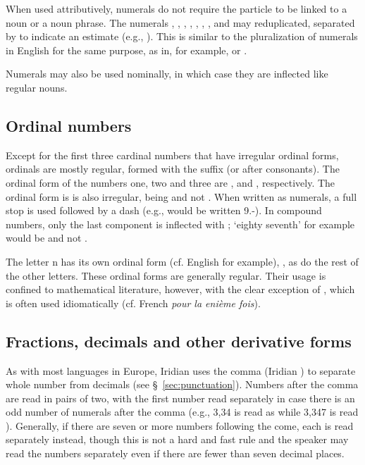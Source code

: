 When used attributively, numerals do not require the particle  to be
linked to a noun or a noun phrase. The numerals , ,
, , , , ,  and
 may reduplicated, separated by  to indicate an
estimate (e.g., ). This is similar to
the pluralization of numerals in English for the same purpose, as in, for
example,  or . 

Numerals may also be used nominally, in which case they are inflected like
regular nouns.

\subsection{Ordinal numbers}
\label{sec:ordinals}

Except for the first three cardinal numbers that have irregular ordinal forms,
ordinals are mostly regular, formed with the suffix  (or 
after consonants). The ordinal form of the numbers one, two and three are
,  and , respectively. The ordinal form is
 is also irregular, being  and not . When
written as numerals, a full stop is used followed by a dash (e.g.,
 would be written 9.-). In compound numbers, only the last
component is inflected with ; `eighty seventh' for example would be
 and not .

The letter n has its own ordinal form (cf. English  for example),
, as do the rest of the other letters. These ordinal forms are
generally regular. Their usage is confined to mathematical literature, however,
with the clear exception of , which is often used idiomatically (cf.
French \textit{pour la enième fois}).


\subsection{Fractions, decimals and other derivative forms}
\label{sec:fractions}

As with most languages in Europe, Iridian uses the comma (Iridian ) to
separate whole number from decimals (see \S~\ref{sec:punctuation}). Numbers
after the comma are read in pairs of two, with the first number read separately
in case there is an odd number of numerals after the comma (e.g., 3,34 is read
as  while 3,347 is read ). Generally, if there are seven or more numbers following the come,
each is read separately instead, though this is not a hard and fast rule and the
speaker may read the numbers separately even if there are fewer than seven
decimal places.

